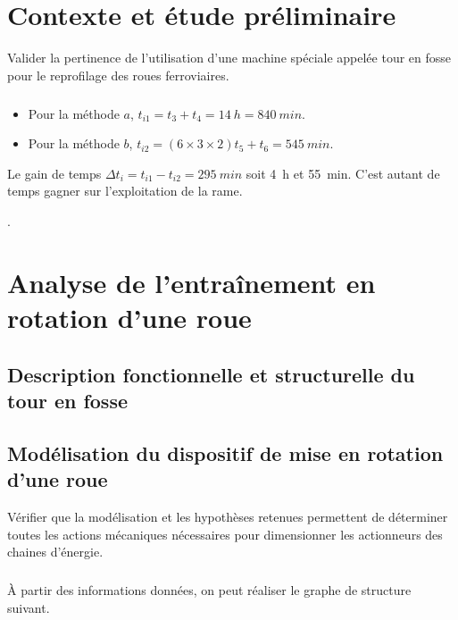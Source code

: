 \documentclass[10pt,fleqn]{article} %
\begin{document}

\vspace{4.5cm}
\pagestyle{fancy}
\thispagestyle{plain}


\def\columnseprulecolor{\color{ocre}}
\setlength{\columnseprule}{0.4pt} 

\section{Contexte et étude préliminaire}

\begin{obj}
Valider la pertinence de l’utilisation d’une machine spéciale appelée tour en fosse pour le reprofilage
des roues ferroviaires.
\end{obj}

\subparagraph{}

\begin{itemize}
\item Pour la méthode $a$, $t_{i1} = t_3 +t_4 = \SI{14}{h}= \SI{840}{min}$.
\item Pour la méthode $b$, $t_{i2} = \left( 6\times 3 \times 2 \right)t_5 +t_6 = \SI{545}{min}$.
\end{itemize}

Le gain de temps $\Delta t_i = t_{i1}-t_{i2}=\SI{295}{min}$ soit \SI{4}{h} et \SI{55}{min}. C'est autant de temps gagner sur l'exploitation de la rame. 


.

\section{Analyse de l’entraînement en rotation d’une roue}
\subsection{Description fonctionnelle et structurelle du tour en fosse}
\subsection{Modélisation du dispositif de mise en rotation d’une roue}


\begin{obj}
Vérifier que la modélisation et les hypothèses retenues permettent de déterminer toutes les actions mécaniques nécessaires pour dimensionner les actionneurs des chaines d’énergie.
\end{obj}

\subparagraph{}
À partir des informations données, on peut réaliser le graphe de structure suivant. 
\end{document}

